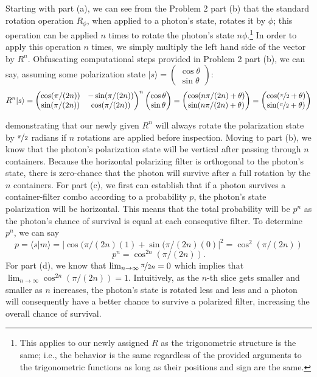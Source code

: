 \documentclass[12pt]{article}
\newenvironment{answer}
    {\begin{adjustwidth}{0pt}{0pt}}
    {\end{adjustwidth}}
\theoremstyle{remark}  %
\begin{document}
    \begin{answer}
        Starting with part (a), we can see from the Problem 2 part (b) that the standard rotation operation $R_\phi$, when applied to a photon's state, rotates it by $\phi$; this operation can be applied $n$ times to rotate the photon's state $n\phi$.\footnote{This applies to our newly assigned $R$ as the trigonometric structure is the same; i.e., the behavior is the same regardless of the provided arguments to the trigonometric functions as long as their positions and sign are the same.} In order to apply this operation $n$ times, we simply multiply the left hand side of the vector by $R^n$. Obfuscating computational steps provided in Problem 2 part (b), we can say, assuming some polarization state $|s\rangle = \left(\begin{smallmatrix}
            \cos\theta \\
            \sin\theta
        \end{smallmatrix}\right)$: $$
            R^n|s\rangle = \begin{pmatrix}
                \cos(\pi/(2n)) & -\sin(\pi/(2n)) \\
                \sin(\pi/(2n)) & \cos(\pi/(2n))
            \end{pmatrix}^n\begin{pmatrix}
                \cos\theta \\
                \sin\theta
            \end{pmatrix} = \begin{pmatrix}
                \cos(n\pi/(2n) + \theta) \\
                \sin(n\pi/(2n) + \theta)
            \end{pmatrix} = \begin{pmatrix}
                \cos(\nicefrac{\pi}{2} + \theta) \\
                \sin(\nicefrac{\pi}{2} + \theta)
            \end{pmatrix}
        $$
    \end{answer} demonstrating that our newly given $R^n$ will always rotate the polarization state by $\nicefrac{\pi}{2}$ radians if $n$ rotations are applied before inspection. Moving to part (b), we know that the photon's polarization state will be vertical after passing through $n$ containers. Because the horizontal polarizing filter is orthogonal to the photon's state, there is zero-chance that the photon will survive after a full rotation by the $n$ containers. For part (c), we first can establish that if a photon survives a container-filter combo according to a probability $p$, the photon's state polarization will be horizontal. This means that the total probability will be $p^n$ as the photon's chance of survival is equal at each consequtive filter. To determine $p^n$, we can say $$p = \langle s|m \rangle = |\cos(\pi/(2n)(1) + \sin(\pi/(2n)(0)|^2 = \cos^2(\pi/(2n)) $$$$p^n = \cos^{2n}(\pi/(2n)).$$ For part (d), we know that $\lim_{n\to \infty}\nicefrac{\pi}{2n}=0$ which implies that $\lim_{n\to \infty}\cos^{2n}(\pi/(2n))=1$. Intuitively, as the $n$-th slice gets smaller and smaller as $n$ increases, the photon's state is rotated less and less and a photon will consequently have a better chance to survive a polarized filter, increasing the overall chance of survival.
\end{document}

